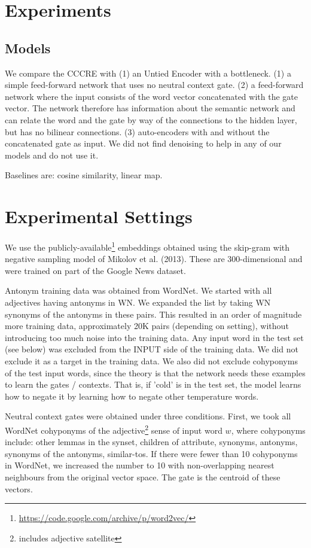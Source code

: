 \documentclass[11pt]{article}
\begin{document}
\section{Experiments}

\subsection{Models}


We compare the CCCRE with (1) an Untied Encoder with a bottleneck. (1) a simple feed-forward network that uses no neutral context gate. (2) a feed-forward network where the input consists of the word vector concatenated with the gate vector. The network therefore has information about the semantic network and can relate the word and the gate by way of the connections to the hidden layer,  but has no bilinear connections. (3) auto-encoders with and without the concatenated gate as input. We did not find denoising to help in any of our models and do not use it.

Baselines are: cosine similarity, linear map.

\section{Experimental Settings}


We use the publicly-available\footnote{\url{https://code.google.com/archive/p/word2vec/}} embeddings obtained using the skip-gram with negative sampling model of Mikolov et al. (2013). These are 300-dimensional and were trained on part of the Google News dataset.

Antonym training data was obtained from WordNet. We started with all adjectives having antonyms in WN. We expanded the list by taking WN synonyms of the antonyms in these pairs. This resulted in an order of magnitude more training data, approximately 20K pairs (depending on setting), without introducing too much noise into the training data. Any input word in the test set (see below) was excluded from the INPUT side of the training data. We did not exclude it as a target in the training data. We also did not exclude cohyponyms of the test input words, since the theory is that the network needs these examples to learn the gates / contexts. That is, if 'cold' is in the test set, the model learns how to negate it by learning how to negate other temperature words.

Neutral context gates were obtained under three conditions. First, we took all WordNet cohyponyms of the adjective\footnote{includes adjective satellite} sense of input word $w$, where cohyponyms include: other lemmas in the synset, children of attribute, synonyms, antonyms, synonyms of the antonyms, similar-tos. If there were fewer than 10 cohyponyms in WordNet, we increased the number to 10 with non-overlapping nearest neighbours from the original vector space. The gate is the centroid of these vectors.
\end{document}
